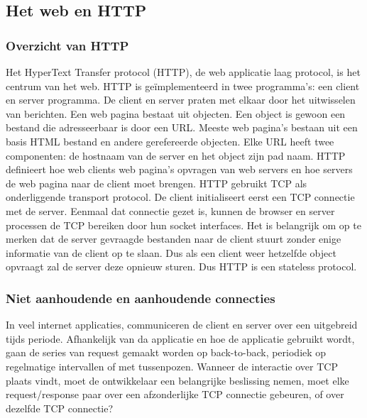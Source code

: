 \subsection{Het web en HTTP}

\subsubsection{Overzicht van HTTP}

Het HyperText Transfer protocol (HTTP), de web applicatie laag protocol, is het centrum van het web. HTTP is geïmplementeerd in twee programma’s: een client en server programma. De client en server praten met elkaar door het uitwisselen van berichten.
Een web pagina bestaat uit objecten. Een object is gewoon een bestand die adresseerbaar is door een URL. Meeste web pagina’s bestaan uit een basis HTML bestand en andere gerefereerde objecten. Elke URL heeft twee componenten: de hostnaam van de server en het object zijn pad naam.
HTTP definieert hoe web clients web pagina’s opvragen van web servers en hoe servers de web pagina naar de client moet brengen.
HTTP gebruikt TCP als onderliggende transport protocol. De client initialiseert eerst een TCP connectie met de server. Eenmaal dat connectie gezet is, kunnen de browser en server processen de TCP bereiken door hun socket interfaces.
Het is belangrijk om op te merken dat de server gevraagde bestanden naar de client stuurt zonder enige informatie van de client op te slaan. Dus als een client weer hetzelfde object opvraagt zal de server deze opnieuw sturen. Dus HTTP is een stateless protocol.

\subsubsection{Niet aanhoudende en aanhoudende connecties}

In veel internet applicaties, communiceren de client en server over een uitgebreid tijds periode. Afhankelijk van da applicatie en hoe de applicatie gebruikt wordt, gaan de series van request gemaakt worden op back-to-back, periodiek op regelmatige intervallen of met tussenpozen. Wanneer de interactie over TCP plaats vindt, moet de ontwikkelaar een belangrijke beslissing nemen, moet elke request/response paar over een afzonderlijke TCP connectie gebeuren, of over dezelfde TCP connectie?

\clearpage


